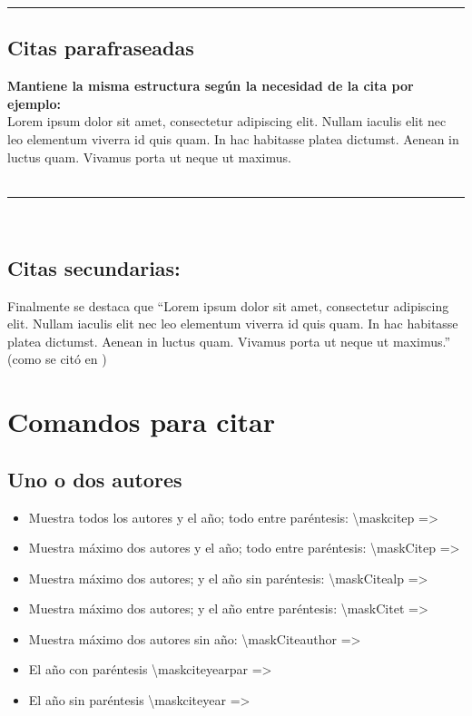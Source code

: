 \documentclass[stu, 12pt, letterpaper, donotrepeattitle, floatsintext, natbib]{apa7}
\begin{document}
\hrule

\subsection{Citas parafraseadas}
\noindent \textbf{Mantiene la misma estructura según la necesidad de la cita por ejemplo:}\\
Lorem ipsum dolor sit amet, consectetur adipiscing elit. Nullam iaculis elit nec leo elementum viverra id quis quam. In hac habitasse platea dictumst. Aenean in luctus quam. Vivamus porta ut neque ut maximus.  \\

\mbox{}\\ \hrule \mbox{}\\

\subsection{Citas secundarias:}
Finalmente se destaca que ``Lorem ipsum dolor sit amet, consectetur adipiscing elit. Nullam iaculis elit nec leo elementum viverra id quis quam. In hac habitasse platea dictumst. Aenean in luctus quam. Vivamus porta ut neque ut maximus.''  (como se citó en )

\newpage

\section{\large Comandos para citar}
\subsection{Uno o dos autores}
\begin{itemize}
    \item Muestra todos los autores y el año; todo entre paréntesis: \textbackslash maskcitep => 
    \item Muestra máximo dos autores y el año; todo entre paréntesis: \textbackslash maskCitep => 
    \item Muestra máximo dos autores; y el año sin paréntesis: \textbackslash maskCitealp => 
    \item Muestra máximo dos autores; y el año entre paréntesis: \textbackslash maskCitet => 
    \item Muestra máximo dos autores sin año: \textbackslash maskCiteauthor => 
    \item El año con paréntesis \textbackslash maskciteyearpar => 
    \item El año sin paréntesis \textbackslash maskciteyear => 
\end{itemize}
\end{document}
